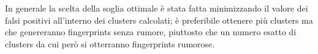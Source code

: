 In generale la scelta della soglia ottimale è stata fatta minimizzando il valore dei falsi positivi all'interno dei clusters calcolati; è preferibile ottenere più clusters ma che genereranno fingerprints senza rumore, piuttosto che un numero esatto di clusters da cui però si otterranno fingerprints rumorose.
